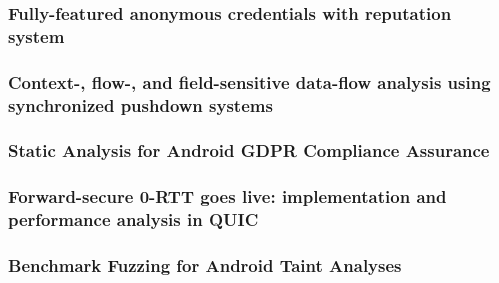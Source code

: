 \documentclass{beamer}
\begin{document}
\begin{frame}[plain]
\frametitle{Fully-featured anonymous credentials with reputation system}
\end{frame}
\begin{frame}[plain]
\frametitle{Context-, flow-, and field-sensitive data-flow analysis using synchronized pushdown systems}
\end{frame}
\begin{frame}[plain]
\frametitle{Static Analysis for Android GDPR Compliance Assurance}
\end{frame}
\begin{frame}[plain]
\frametitle{Forward-secure 0-RTT goes live: implementation and performance analysis in QUIC}
\end{frame}
\begin{frame}[plain]
\frametitle{Benchmark Fuzzing for Android Taint Analyses}
\end{frame}
\end{document}
